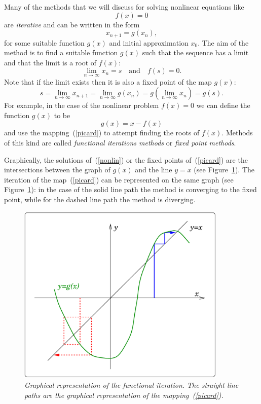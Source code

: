Many of the methods that we will discuss for solving nonlinear
equations like
%
\begin{equation}
  f(x)=0 \label{nonlin}
\end{equation}
%
are \textit{iterative} and can be written in the form
%
\begin{equation}
  x_{n+1} = g(x_n), \label{picard}
\end{equation}
%
for some suitable function $g(x)$ and initial approximation $x_0$.
The aim of the method is to find a suitable function $g(x)$ such that
the sequence has a limit and that the limit is a root of $f(x)$:
%
\begin{equation*}
  \lim_{n \to \infty} x_n = s \quad \text{and} \quad f(s)=0.
\end{equation*}
%
Note that if the limit exists then it is also a fixed point of the map
$g(x)$:
%
\begin{equation*}
  s = \lim_{n \to \infty} x_{n+1} =
  \lim_{n \to \infty} g(x_n) =
  g \left ( \lim_{n \to \infty} x_n \right ) = g(s) .
\end{equation*}
%
For example, in the case of the nonlinear problem $f(x) = 0$ we can
define the function $g(x)$ to be
%
\begin{equation*}
  g(x) = x - f(x)
\end{equation*}
%
and use the mapping~(\ref{picard}) to attempt finding the roots of
$f(x)$.  Methods of this kind are called \textit{functional iterations
  methods} or \textit{fixed point methods}.

Graphically, the solutions of~(\ref{nonlin}) or the fixed points
of~(\ref{picard}) are the intersections between the graph of $g(x)$
and the line $y=x$ (see Figure~\ref{fig:picard}).  The iteration of
the map~(\ref{picard}) can be represented on the same graph (see
Figure~\ref{fig:picard}): in the case of the solid line path the
method is converging to the fixed point, while for the dashed line
path the method is diverging.

\begin{figure}
  \centerline{\includegraphics[width=100mm]{figures/picard}}
  \caption{\label{fig:picard} \it Graphical representation of the
    functional iteration.  The straight line paths are the graphical
    representation of the mapping~(\ref{picard}).}
\end{figure}

